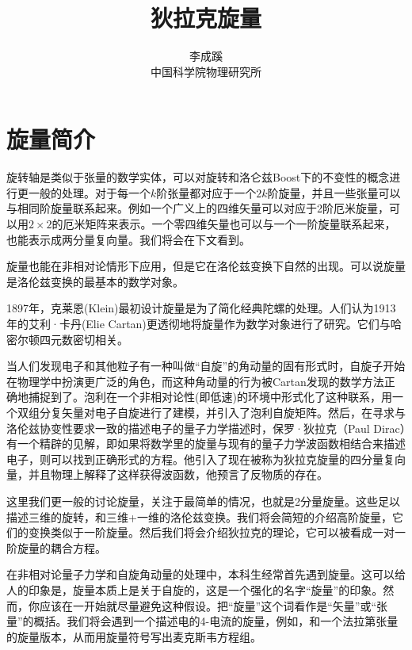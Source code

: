 \documentclass[a4paper,12pt]{article}
\begin{document}
    \title{狄拉克旋量}
    \author{李成蹊\\中国科学院物理研究所}
    \maketitle
    \section{旋量简介}
    旋转轴是类似于张量的数学实体，可以对旋转和洛仑兹Boost下的不变性的概念进行更一般的处理。对于每一个$k$阶张量都对应于一个$2k$阶旋量，并且一些张量可以与相同阶旋量联系起来。例如一个广义上的四维矢量可以对应于2阶厄米旋量，可以用$2\times 2$的厄米矩阵来表示。一个零四维矢量也可以与一个一阶旋量联系起来，也能表示成两分量复向量。我们将会在下文看到。

    旋量也能在非相对论情形下应用，但是它在洛伦兹变换下自然的出现。可以说旋量是洛伦兹变换的最基本的数学对象。

    1897年，克莱恩(Klein)最初设计旋量是为了简化经典陀螺的处理。人们认为1913年的艾利·卡丹(Elie Cartan)更透彻地将旋量作为数学对象进行了研究。它们与哈密尔顿四元数密切相关。

    当人们发现电子和其他粒子有一种叫做“自旋”的角动量的固有形式时，自旋子开始在物理学中扮演更广泛的角色，而这种角动量的行为被Cartan发现的数学方法正确地捕捉到了。泡利在一个非相对论性(即低速)的环境中形式化了这种联系，用一个双组分复矢量对电子自旋进行了建模，并引入了泡利自旋矩阵。然后，在寻求与洛伦兹协变性要求一致的描述电子的量子力学描述时，保罗·狄拉克（Paul Dirac）有一个精辟的见解，即如果将数学里的旋量与现有的量子力学波函数相结合来描述电子，则可以找到正确形式的方程。他引入了现在被称为狄拉克旋量的四分量复向量，并且物理上解释了这样获得波函数，他预言了反物质的存在。

    这里我们更一般的讨论旋量，关注于最简单的情况，也就是2分量旋量。这些足以描述三维的旋转，和三维+一维的洛伦兹变换。我们将会简短的介绍高阶旋量，它们的变换类似于一阶旋量。然后我们将会介绍狄拉克的理论，它可以被看成一对一阶旋量的耦合方程。

    在非相对论量子力学和自旋角动量的处理中，本科生经常首先遇到旋量。这可以给人的印象是，旋量本质上是关于自旋的，这是一个强化的名字“旋量”的印象。然而，你应该在一开始就尽量避免这种假设。把“旋量”这个词看作是“矢量”或“张量”的概括。我们将会遇到一个描述电的4-电流的旋量，例如，和一个法拉第张量的旋量版本，从而用旋量符号写出麦克斯韦方程组。
\end{document}
